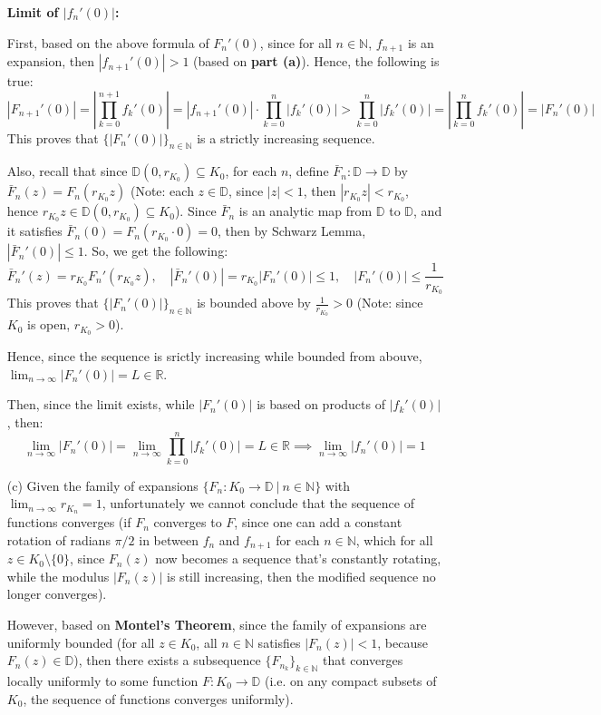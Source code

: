 \documentclass{article}
\begin{document}
\begin{itemize}
    \textbf{Limit of $|f_n'(0)|$:}

    First, based on the above formula of $F_n'(0)$, since for all $n\in\mathbb{N}$, $f_{n+1}$ is an expansion, then $|f_{n+1}'(0)|>1$ (based on \textbf{part (a)}). Hence, the following is true:
    $$|F_{n+1}'(0)|=\left|\prod_{k=0}^{n+1}f_k'(0)\right| = |f_{n+1}'(0)|\cdot\prod_{k=0}^{n}|f_k'(0)| > \prod_{k=0}^{n}|f_k'(0)| = \left|\prod_{k=0}^{n}f_k'(0)\right|=|F_n'(0)|$$
    This proves that $\{|F_{n}'(0)|\}_{n\in\mathbb{N}}$ is a strictly increasing sequence.

    Also, recall that since $\mathbb{D}(0,r_{K_0})\subseteq K_0$, for each $n$, define $\bar{F}_n:\mathbb{D}\rightarrow\mathbb{D}$ by $\bar{F}_n(z)=F_n(r_{K_0}z)$ (Note: each $z\in \mathbb{D}$, since $|z|<1$, then $|r_{K_0}z|<r_{K_0}$, hence $r_{K_0}z\in \mathbb{D}(0,r_{K_0})\subseteq K_0$).
    Since $\bar{F}_n$ is an analytic map from $\mathbb{D}$ to $\mathbb{D}$, and it satisfies $\bar{F}_n(0)=F_n(r_{K_0}\cdot 0)=0$, then by Schwarz Lemma, $|\bar{F}_n'(0)|\leq 1$. So, we get the following:
    $$\bar{F}_n'(z)=r_{K_0}F_n'(r_{K_0}z),\quad |\bar{F}_n'(0)|=r_{K_0}|F_n'(0)| \leq 1,\quad |F_n'(0)|\leq \frac{1}{r_{K_0}}$$
    This proves that $\{|F_{n}'(0)|\}_{n\in\mathbb{N}}$ is bounded above by $\frac{1}{r_{K_0}}>0$ (Note: since $K_0$ is open, $r_{K_0}>0$).

    Hence, since the sequence is srictly increasing while bounded from abouve, $\lim_{n\rightarrow \infty}|F_n'(0)|=L\in\mathbb{R}$.

    Then, since the limit exists, while $|F_n'(0)|$ is based on products of $|f_k'(0)|$, then:
    $$\lim_{n\rightarrow\infty}|F_n'(0)|=\lim_{n\rightarrow\infty}\prod_{k=0}^{n}|f_k'(0)|=L\in\mathbb{R} \implies \lim_{n\rightarrow\infty}|f_n'(0)|=1$$

    \hfil

    \item[(c)] Given the family of expansions $\{F_n:K_0\rightarrow\mathbb{D}\ |\ n\in\mathbb{N}\}$ with $\lim_{n\rightarrow\infty}r_{K_n}=1$, unfortunately we cannot conclude that the sequence of functions converges (if $F_n$ converges to $F$, since one can add a constant rotation of radians $\pi/2$ in between $f_n$ and $f_{n+1}$ for each $n\in\mathbb{N}$,
    which for all $z\in K_0\setminus\{0\}$, since $F_n(z)$ now becomes a sequence that's constantly rotating, while the modulus $|F_n(z)|$ is still increasing, then the modified sequence no longer converges).

    However, based on \textbf{Montel's Theorem}, since the family of expansions are uniformly bounded (for all $z\in K_0$, all $n\in\mathbb{N}$ satisfies $|F_n(z)|<1$, because $F_n(z)\in\mathbb{D}$), then there exists a subsequence $\{F_{n_k}\}_{k\in\mathbb{N}}$ that converges locally uniformly to some function $F:K_0\rightarrow\mathbb{D}$ (i.e. on any compact subsets of $K_0$, the sequence of functions converges uniformly).
    

\end{itemize}
\end{document}
